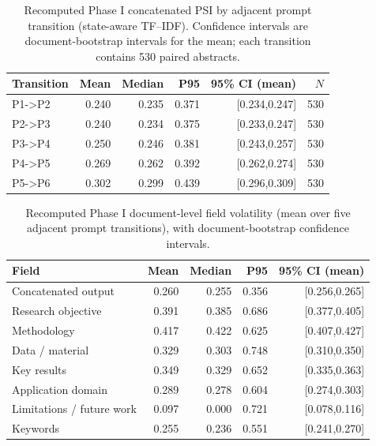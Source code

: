 \begin{table}[t]
\centering
\small
\caption{Recomputed Phase I concatenated PSI by adjacent prompt transition (state-aware TF--IDF). Confidence intervals are document-bootstrap intervals for the mean; each transition contains 530 paired abstracts.}
\label{tab:phase1-recovered-psi}
\begin{tabular}{lrrrrr}
\toprule
Transition & Mean & Median & P95 & 95\% CI (mean) & $N$ \\
\midrule
P1->P2 & 0.240 & 0.235 & 0.371 & [0.234,0.247] & 530 \\
P2->P3 & 0.240 & 0.234 & 0.375 & [0.233,0.247] & 530 \\
P3->P4 & 0.250 & 0.246 & 0.381 & [0.243,0.257] & 530 \\
P4->P5 & 0.269 & 0.262 & 0.392 & [0.262,0.274] & 530 \\
P5->P6 & 0.302 & 0.299 & 0.439 & [0.296,0.309] & 530 \\
\bottomrule
\end{tabular}
\end{table}

\begin{table}[t]
\centering
\small
\caption{Recomputed Phase I document-level field volatility (mean over five adjacent prompt transitions), with document-bootstrap confidence intervals.}
\label{tab:phase1-recovered-vol}
\begin{tabular}{lrrrr}
\toprule
Field & Mean & Median & P95 & 95\% CI (mean) \\
\midrule
Concatenated output & 0.260 & 0.255 & 0.356 & [0.256,0.265] \\
Research objective & 0.391 & 0.385 & 0.686 & [0.377,0.405] \\
Methodology & 0.417 & 0.422 & 0.625 & [0.407,0.427] \\
Data / material & 0.329 & 0.303 & 0.748 & [0.310,0.350] \\
Key results & 0.349 & 0.329 & 0.652 & [0.335,0.363] \\
Application domain & 0.289 & 0.278 & 0.604 & [0.274,0.303] \\
Limitations / future work & 0.097 & 0.000 & 0.721 & [0.078,0.116] \\
Keywords & 0.255 & 0.236 & 0.551 & [0.241,0.270] \\
\bottomrule
\end{tabular}
\end{table}

